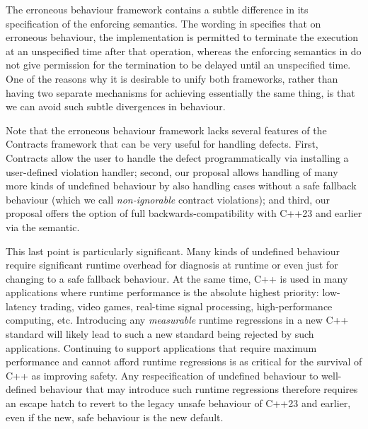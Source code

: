 The erroneous behaviour framework contains a subtle difference in its specification of the enforcing semantics. The wording in \cite{P2795R5} specifies that on erroneous behaviour, the implementation is permitted to terminate the execution at an unspecified time after that operation, whereas the enforcing semantics in \cite{P2900R6} do not give permission for the termination to be delayed until an unspecified time. One of the reasons why it is desirable to unify both frameworks, rather than having two separate mechanisms for achieving essentially the same thing, is that we can avoid such subtle divergences in behaviour.

Note that the erroneous behaviour framework lacks several features of the Contracts framework that can be very useful for handling defects. First, Contracts allow the user to handle the defect programmatically via installing a user-defined violation handler; second, our proposal allows handling of many more kinds of undefined behaviour by also handling cases without a safe fallback behaviour (which we call \emph{non-ignorable} contract violations); and third, our proposal offers the option of full backwards-compatibility with C++23 and earlier via the  semantic.

This last point is particularly significant. Many kinds of undefined behaviour require significant runtime overhead for diagnosis at runtime or even just for changing to a safe fallback behaviour. At the same time, C++ is used in many applications where runtime performance is the absolute highest priority: low-latency trading, video games, real-time signal processing, high-performance computing, etc. Introducing any \emph{measurable} runtime regressions in a new C++ standard will likely lead to such a new standard being rejected by such applications. Continuing to support applications that require maximum performance and cannot afford runtime regressions is as critical for the survival of C++ as improving safety. Any respecification of undefined behaviour to well-defined behaviour that may introduce such runtime regressions therefore requires an escape hatch to revert to the legacy unsafe behaviour of C++23 and earlier, even if the new, safe behaviour is the new default.

